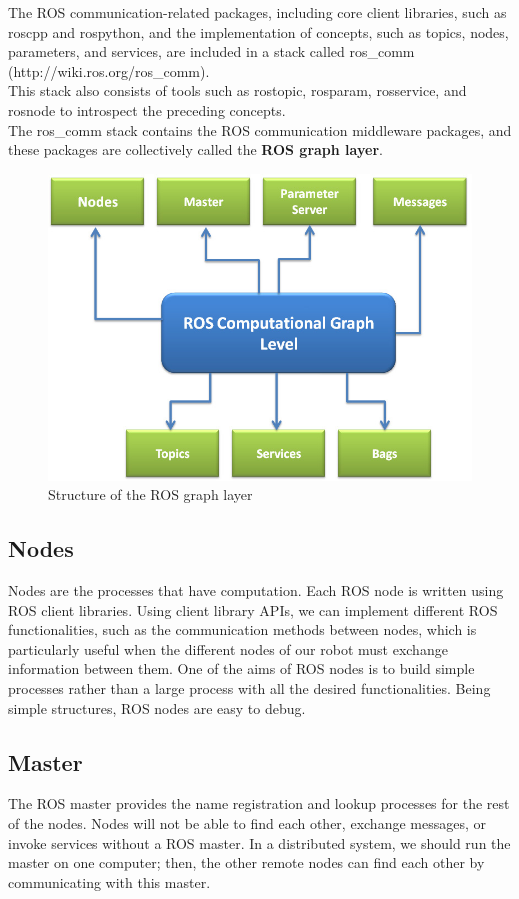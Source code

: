 \documentclass[../../main]{subfiles}
\begin{document}
The ROS communication-related packages, including core client libraries, such as roscpp and rospython, and the implementation of concepts, such as topics, nodes, parameters, and services, are included in a stack called ros\_comm (http://wiki.ros.org/ros\_comm).
\\
This stack also consists of tools such as rostopic, rosparam, rosservice, and rosnode to introspect the preceding concepts.
\\
The ros\_comm stack contains the ROS communication middleware packages, and these packages are collectively called the \textbf{ROS graph layer}.
\begin{figure}[ht]
    \centering
    \includegraphics{img/rosgraph.jpg}
    \caption{Structure of the ROS graph layer}
\end{figure}
\newpage
\subsection{Nodes}
Nodes are the processes that have computation. Each ROS node is written
using ROS client libraries. Using client library APIs, we can implement different
ROS functionalities, such as the communication methods between nodes, which
is particularly useful when the different nodes of our robot must exchange
information between them. One of the aims of ROS nodes is to build simple
processes rather than a large process with all the desired functionalities. Being
simple structures, ROS nodes are easy to debug.
\subsection{Master}
The ROS master provides the name registration and lookup processes for
the rest of the nodes. Nodes will not be able to find each other, exchange messages,
or invoke services without a ROS master. In a distributed system, we should run
the master on one computer; then, the other remote nodes can find each other by
communicating with this master.
\end{document}
